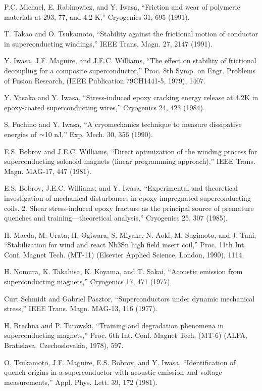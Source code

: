 \noindent [7.30] P.C. Michael, E. Rabinowicz, and Y. Iwasa, ``Friction and wear of polymeric materials at 293, 77, and 4.2 K,” Cryogenics 31, 695 (1991).

\noindent [7.31] T. Takao and O. Tsukamoto, ``Stability against the frictional motion of conductor in superconducting windings,” IEEE Trans. Magn. 27, 2147 (1991).

\noindent [7.32] Y. Iwasa, J.F. Maguire, and J.E.C. Williams, ``The effect on stability of frictional decoupling for a composite superconductor,” Proc. 8th Symp. on Engr. Problems of Fusion Research, (IEEE Publication 79CH1441-5, 1979), 1407.

\noindent [7.33] Y. Yasaka and Y. Iwasa, ``Stress-induced epoxy cracking energy release at 4.2K in epoxy-coated superconducting wires,” Cryogenics 24, 423 (1984).

\noindent [7.34] S. Fuchino and Y. Iwasa, ``A cryomechanics technique to measure dissipative energies of ∼10 nJ,” Exp. Mech. 30, 356 (1990).

\noindent [7.35] E.S. Bobrov and J.E.C. Williams, ``Direct optimization of the winding process for superconducting solenoid magnets (linear programming approach),” IEEE Trans. Magn. MAG-17, 447 (1981).

\noindent [7.36] E.S. Bobrov, J.E.C. Williams, and Y. Iwasa, ``Experimental and theoretical investigation
of mechanical disturbances in epoxy-impregnated superconducting coils. 2.
Shear stress-induced epoxy fracture as the principal source of premature quenches
and training—theoretical analysis,” Cryogenics 25, 307 (1985).

\noindent [7.37] H. Maeda, M. Urata, H. Ogiwara, S. Miyake, N. Aoki, M. Sugimoto, and J. Tani, ``Stabilization for wind and react Nb3Sn high field insert coil,” Proc. 11th Int. Conf. Magnet Tech. (MT-11) (Elsevier Applied Science, London, 1990), 1114.

\noindent [7.38] H. Nomura, K. Takahisa, K. Koyama, and T. Sakai, ``Acoustic emission from superconducting magnets,” Cryogenics 17, 471 (1977).

\noindent [7.39] Curt Schmidt and Gabriel Pasztor, ``Superconductors under dynamic mechanical stress,” IEEE Trans. Magn. MAG-13, 116 (1977).

\noindent [7.40] H. Brechna and P. Turowski, ``Training and degradation phenomena in superconducting magnets,” Proc. 6th Int. Conf. Magnet Tech. (MT-6) (ALFA, Bratislava, Czechoslovakia, 1978), 597.

\noindent [7.41] O. Tsukamoto, J.F. Maguire, E.S. Bobrov, and Y. Iwasa, ``Identification of quench origins in a superconductor with acoustic emission and voltage measurements,” Appl. Phys. Lett. 39, 172 (1981).

